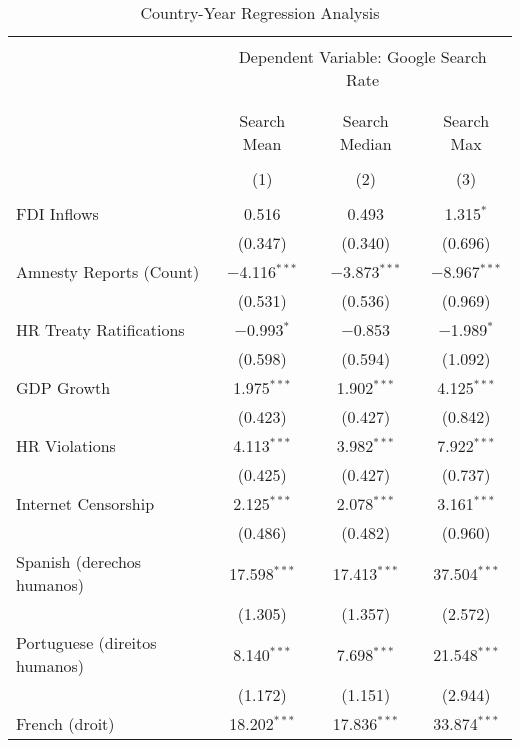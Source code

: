 
\begin{table}[!htbp] \centering 
  \caption{Country-Year Regression Analysis} 
  \label{} 
\begin{tabular}{@{\extracolsep{5pt}}lccc} 
\\[-1.8ex]\hline 
\hline \\[-1.8ex] 
 & \multicolumn{3}{c}{Dependent Variable: Google Search Rate} \\ 
\cline{2-4} 
\\[-1.8ex] & \multicolumn{3}{c}{ } \\ 
 & Search Mean & Search Median & Search Max \\ 
\\[-1.8ex] & (1) & (2) & (3)\\ 
\hline \\[-1.8ex] 
 FDI Inflows & 0.516 & 0.493 & 1.315$^{*}$ \\ 
  & (0.347) & (0.340) & (0.696) \\ 
  Amnesty Reports (Count) & $-$4.116$^{***}$ & $-$3.873$^{***}$ & $-$8.967$^{***}$ \\ 
  & (0.531) & (0.536) & (0.969) \\ 
  HR Treaty Ratifications & $-$0.993$^{*}$ & $-$0.853 & $-$1.989$^{*}$ \\ 
  & (0.598) & (0.594) & (1.092) \\ 
  GDP Growth & 1.975$^{***}$ & 1.902$^{***}$ & 4.125$^{***}$ \\ 
  & (0.423) & (0.427) & (0.842) \\ 
  HR Violations & 4.113$^{***}$ & 3.982$^{***}$ & 7.922$^{***}$ \\ 
  & (0.425) & (0.427) & (0.737) \\ 
  Internet Censorship & 2.125$^{***}$ & 2.078$^{***}$ & 3.161$^{***}$ \\ 
  & (0.486) & (0.482) & (0.960) \\ 
  Spanish (derechos humanos) & 17.598$^{***}$ & 17.413$^{***}$ & 37.504$^{***}$ \\ 
  & (1.305) & (1.357) & (2.572) \\ 
  Portuguese (direitos humanos) & 8.140$^{***}$ & 7.698$^{***}$ & 21.548$^{***}$ \\ 
  & (1.172) & (1.151) & (2.944) \\ 
  French (droit) & 18.202$^{***}$ & 17.836$^{***}$ & 33.874$^{***}$ \\ 

\end{tabular}
\end{table}
